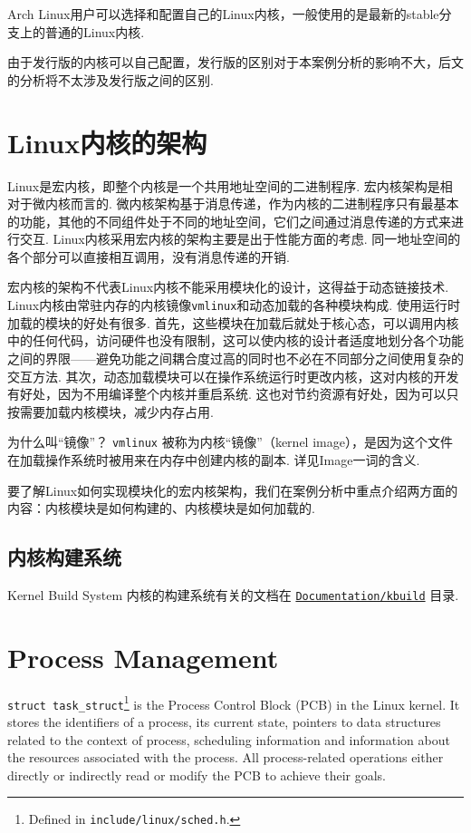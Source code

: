 \documentclass[11pt]{article}
\begin{document}
Arch Linux用户可以选择和配置自己的Linux内核，一般使用的是最新的stable分支上的普通的Linux内核.
\begin{notebox}
	由于发行版的内核可以自己配置，发行版的区别对于本案例分析的影响不大，后文的分析将不太涉及发行版之间的区别.
\end{notebox}
\section{Linux内核的架构}
Linux是宏内核，即整个内核是一个共用地址空间的二进制程序.
宏内核架构是相对于微内核而言的.
微内核架构基于消息传递，作为内核的二进制程序只有最基本的功能，其他的不同组件处于不同的地址空间，它们之间通过消息传递的方式来进行交互.
Linux内核采用宏内核的架构主要是出于性能方面的考虑.\cite{silberschatz2021operating}
同一地址空间的各个部分可以直接相互调用，没有消息传递的开销.

宏内核的架构不代表Linux内核不能采用模块化的设计，这得益于动态链接技术.
Linux内核由常驻内存的内核镜像\lstinline{vmlinux}和动态加载的各种模块构成.
使用运行时加载的模块的好处有很多.
首先，这些模块在加载后就处于核心态，可以调用内核中的任何代码，访问硬件也没有限制，这可以使内核的设计者适度地划分各个功能之间的界限——避免功能之间耦合度过高的同时也不必在不同部分之间使用复杂的交互方法.
其次，动态加载模块可以在操作系统运行时更改内核，这对内核的开发有好处，因为不用编译整个内核并重启系统.
这也对节约资源有好处，因为可以只按需要加载内核模块，减少内存占用.

\begin{qbox}{为什么叫“镜像”？}
	\lstinline{vmlinux} 被称为内核“镜像”（kernel image），是因为这个文件在加载操作系统时被用来在内存中创建内核的副本.
	详见Image一词的含义\cite{imageWik70:online}.
\end{qbox}

要了解Linux如何实现模块化的宏内核架构，我们在案例分析中重点介绍两方面的内容：内核模块是如何构建的、内核模块是如何加载的.

\subsection{内核构建系统}
\begin{readsrcbox}{Kernel Build System}
	内核的构建系统有关的文档在 \href{https://docs.kernel.org/kbuild/index.html}{\lstinline{Documentation/kbuild}} 目录.

\end{readsrcbox}
\section{Process Management}
\lstinline{struct task_struct}\footnote{Defined in \lstinline{include/linux/sched.h}.\label{sched.h}} is the Process Control Block (PCB) in the Linux kernel.
It stores the identifiers of a process, its current state, pointers to data structures related to the context of process, scheduling information and information about the resources associated with the process.
All process-related operations either directly or indirectly read or modify the PCB to achieve their goals.
\end{document}
